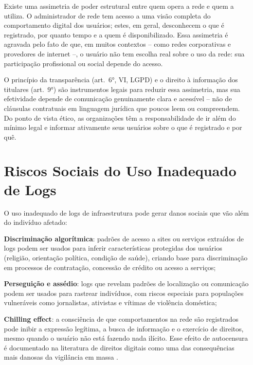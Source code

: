 Existe uma assimetria de poder estrutural entre quem opera a rede e quem a utiliza. O administrador de rede tem acesso a uma visão completa do comportamento digital dos usuários; estes, em geral, desconhecem o que é registrado, por quanto tempo e a quem é disponibilizado. Essa assimetria é agravada pelo fato de que, em muitos contextos -- como redes corporativas e provedores de internet --, o usuário não tem escolha real sobre o uso da rede: sua participação profissional ou social depende do acesso.

O princípio da transparência (art.\ 6°, VI, LGPD) e o direito à informação dos titulares (art.\ 9°) são instrumentos legais para reduzir essa assimetria, mas sua efetividade depende de comunicação genuinamente clara e acessível -- não de cláusulas contratuais em linguagem jurídica que poucos leem ou compreendem. Do ponto de vista ético, as organizações têm a responsabilidade de ir além do mínimo legal e informar ativamente seus usuários sobre o que é registrado e por quê.

\section{Riscos Sociais do Uso Inadequado de Logs}
\label{sec:riscos-sociais}

O uso inadequado de logs de infraestrutura pode gerar danos sociais que vão além do indivíduo afetado:

\begin{alineas}
    \item \textbf{Discriminação algorítmica}: padrões de acesso a sites ou serviços extraídos de logs podem ser usados para inferir características protegidas dos usuários (religião, orientação política, condição de saúde), criando base para discriminação em processos de contratação, concessão de crédito ou acesso a serviços;
    \item \textbf{Perseguição e assédio}: logs que revelam padrões de localização ou comunicação podem ser usados para rastrear indivíduos, com riscos especiais para populações vulneráveis como jornalistas, ativistas e vítimas de violência doméstica;
    \item \textbf{Chilling effect}: a consciência de que comportamentos na rede são registrados pode inibir a expressão legítima, a busca de informação e o exercício de direitos, mesmo quando o usuário não está fazendo nada ilícito. Esse efeito de autocensura é documentado na literatura de direitos digitais como uma das consequências mais danosas da vigilância em massa \cite{solove2011nothing}.
\end{alineas}

